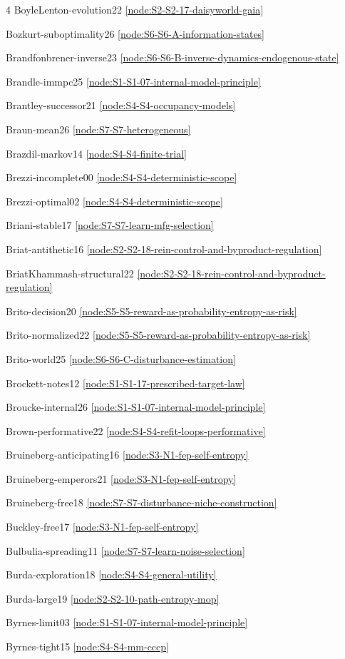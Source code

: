 \documentclass[10pt]{article}
\begin{document}
{\begin{multicols}{4}
BoyleLenton-evolution22 \hfill \ref{node:S2-S2-17-daisyworld-gaia}\par
Bozkurt-suboptimality26 \hfill \ref{node:S6-S6-A-information-states}\par
Brandfonbrener-inverse23 \hfill \ref{node:S6-S6-B-inverse-dynamics-endogenous-state}\par
Brandle-immpc25 \hfill \ref{node:S1-S1-07-internal-model-principle}\par
Brantley-successor21 \hfill \ref{node:S4-S4-occupancy-models}\par
Braun-mean26 \hfill \ref{node:S7-S7-heterogeneous}\par
Brazdil-markov14 \hfill \ref{node:S4-S4-finite-trial}\par
Brezzi-incomplete00 \hfill \ref{node:S4-S4-deterministic-scope}\par
Brezzi-optimal02 \hfill \ref{node:S4-S4-deterministic-scope}\par
Briani-stable17 \hfill \ref{node:S7-S7-learn-mfg-selection}\par
Briat-antithetic16 \hfill \ref{node:S2-S2-18-rein-control-and-byproduct-regulation}\par
BriatKhammash-structural22 \hfill \ref{node:S2-S2-18-rein-control-and-byproduct-regulation}\par
Brito-decision20 \hfill \ref{node:S5-S5-reward-as-probability-entropy-as-risk}\par
Brito-normalized22 \hfill \ref{node:S5-S5-reward-as-probability-entropy-as-risk}\par
Brito-world25 \hfill \ref{node:S6-S6-C-disturbance-estimation}\par
Brockett-notes12 \hfill \ref{node:S1-S1-17-prescribed-target-law}\par
Broucke-internal26 \hfill \ref{node:S1-S1-07-internal-model-principle}\par
Brown-performative22 \hfill \ref{node:S4-S4-refit-loops-performative}\par
Bruineberg-anticipating16 \hfill \ref{node:S3-N1-fep-self-entropy}\par
Bruineberg-emperors21 \hfill \ref{node:S3-N1-fep-self-entropy}\par
Bruineberg-free18 \hfill \ref{node:S7-S7-disturbance-niche-construction}\par
Buckley-free17 \hfill \ref{node:S3-N1-fep-self-entropy}\par
Bulbulia-spreading11 \hfill \ref{node:S7-S7-learn-noise-selection}\par
Burda-exploration18 \hfill \ref{node:S4-S4-general-utility}\par
Burda-large19 \hfill \ref{node:S2-S2-10-path-entropy-mop}\par
Byrnes-limit03 \hfill \ref{node:S1-S1-07-internal-model-principle}\par
Byrnes-tight15 \hfill \ref{node:S4-S4-mm-cccp}\par


\end{multicols}}
\end{document}
